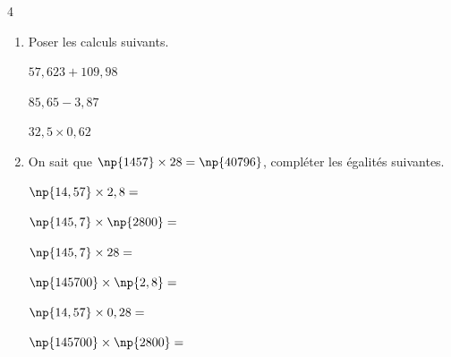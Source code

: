 \documentclass[a4paper]{book}
\begin{document}
{    \begin{exerciceNote}{4}
        \begin{enumerate}
            \item Poser les calculs suivants.

            \medskip
        
            \begin{minipage}{0.33\linewidth}
                \quad $57,623+109,98$
                \vspace{4cm}
            \end{minipage}
            \hfill\vline\hfill
            \begin{minipage}{0.33\linewidth}
                \quad $85,65-3,87$
                \vspace{4cm}
            \end{minipage}        
            \hfill\vline\hfill
            \begin{minipage}{0.33\linewidth}
                \quad $32,5 \times 0,62 $
                \vspace{4cm}
            \end{minipage}

            \item On sait que $\np{1457}\times28=\np{40796}$, compléter les égalités suivantes.

            \medskip
        
            \begin{minipage}{0.33\linewidth}
                $\np{14,57}\times2,8=$
                
                \bigskip
                
                 $\np{145,7}\times\np{2800}=$
            \end{minipage}
            \hfill\vline\hfill
            \begin{minipage}{0.33\linewidth}
                \quad $\np{145,7}\times28=$
                
                \bigskip
                
                 \quad $\np{145700}\times\np{2,8}=$
            \end{minipage}        
            \hfill\vline\hfill
            \begin{minipage}{0.33\linewidth}
                \quad $\np{14,57}\times0,28=$
                
                \bigskip
                
                \quad $\np{145700}\times\np{2800}=$
            \end{minipage}
        \end{enumerate}
    \end{exerciceNote}
    

}
\end{document}
